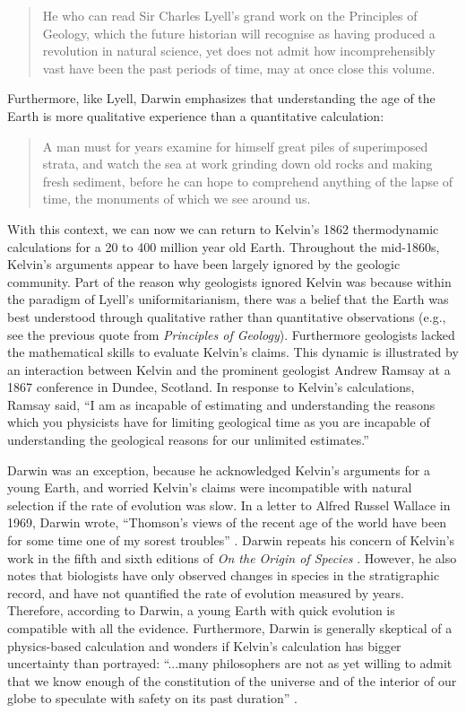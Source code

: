 \documentclass[12pt]{article}
\begin{document}
\begin{quote}
  He who can read Sir Charles Lyell's grand work on the Principles of Geology, which the future historian will recognise as having produced a revolution in natural science, yet does not admit how incomprehensibly vast have been the past periods of time, may at once close this volume. \citep{Darwin_1859}
\end{quote}
Furthermore, like Lyell, Darwin emphasizes that understanding the age of the Earth is more qualitative experience than a quantitative calculation:

\begin{quote}
  A man must for years examine for himself great piles of superimposed strata, and watch the sea at work grinding down old rocks and making fresh sediment, before he can hope to comprehend anything of the lapse of time, the monuments of which we see around us. \citep{Darwin_1859}
\end{quote}

With this context, we can now we can return to Kelvin's 1862 thermodynamic calculations for a 20 to 400 million year old Earth. Throughout the mid-1860s, Kelvin's arguments appear to have been largely ignored by the geologic community. Part of the reason why geologists ignored Kelvin was because within the paradigm of Lyell's uniformitarianism, there was a belief that the Earth was best understood through qualitative rather than quantitative observations (e.g., see the previous quote from \emph{Principles of Geology}). Furthermore geologists lacked the mathematical skills to evaluate Kelvin's claims. This dynamic is illustrated by an interaction between Kelvin and the prominent geologist Andrew Ramsay at a 1867 conference in Dundee, Scotland. In response to Kelvin's calculations, Ramsay said, ``I am as incapable of estimating and understanding the reasons which you physicists have for limiting geological time as you are incapable of understanding the geological reasons for our unlimited estimates.''

Darwin was an exception, because he acknowledged Kelvin's arguments for a young Earth, and worried Kelvin's claims were incompatible with natural selection if the rate of evolution was slow. In a letter to Alfred Russel Wallace in 1969, Darwin wrote, ``Thomson's views of the recent age of the world have been for some time one of my sorest troubles'' \citep{Marchant_1916}. Darwin repeats his concern of Kelvin's work in the fifth and sixth editions of \emph{On the Origin of Species} \citep{Darwin_1869,Darwin_1872}. However, he also notes that biologists have only observed changes in species in the stratigraphic record, and have not quantified the rate of evolution measured by years. Therefore, according to Darwin, a young Earth with quick evolution is compatible with all the evidence. Furthermore, Darwin is generally skeptical of a physics-based calculation and wonders if Kelvin's calculation has bigger uncertainty than portrayed: ``...many philosophers are not as yet willing to admit that we know enough of the constitution of the universe and of the interior of our globe to speculate with safety on its past duration'' \citep{Darwin_1872}.
\end{document}
